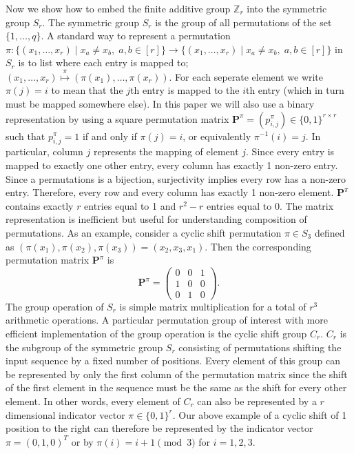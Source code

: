 Now we show how to embed the finite additive group $\mathbb{Z}_r$ into the symmetric group $S_r$. The symmetric group $S_r$ is the group of all permutations of the set $\{1, \dots, q\}$. A standard way to represent a permutation $\pi \colon \{(x_1, \dots, x_r) \mid x_a \neq x_b, \; a,b \in [r]\} \to \{(x_1, \dots, x_r) \mid x_a \neq x_b, \; a,b \in [r]\}$ in $S_r$ is to list where each entry is mapped to; $(x_1,\dots,x_r) \stackrel{\pi}{\mapsto} (\pi(x_1), \dots, \pi(x_r))$. For each seperate element we write $\pi(j) = i$ to mean that the $j$th entry is mapped to the $i$th entry (which in turn must be mapped somewhere else). In this paper we will also use a binary representation by using a square permutation matrix $\mathbf{P}^{\pi} = (p^{\pi}_{i,j}) \in \{0,1\}^{r \times r}$ such that $p^{\pi}_{i, j} = 1$ if and only if $\pi(j) = i$, or equivalently $\pi^{-1}(i) = j$. In particular, column $j$ represents the mapping of element $j$. Since every entry is mapped to exactly one other entry, every column has exactly 1 non-zero entry. Since a permutations is a bijection, surjectivity implies every row has a non-zero entry. Therefore, every row and every column has exactly 1 non-zero element. $\mathbf{P}^{\pi}$ contains exactly $r$ entries equal to 1 and $r^2 - r$ entries equal to 0. The matrix representation is inefficient but useful for understanding composition of permutations. As an example, consider a cyclic shift permutation $\pi \in S_3$ defined as $(\pi(x_1),\pi(x_2),\pi(x_3))=(x_2,x_3,x_1)$. Then the corresponding permutation matrix $\mathbf{P}^{\pi}$ is
\begin{equation*}
    \mathbf{P}^{\pi} = \begin{pmatrix}
        0 & 0 & 1 \\
        1 & 0 & 0 \\
        0 & 1 & 0
    \end{pmatrix}.
\end{equation*}
The group operation of $S_r$ is simple matrix multiplication for a total of $r^3$ arithmetic operations. A particular permutation group of interest with more efficient implementation of the group operation is the cyclic shift group $C_r$. $C_r$ is the subgroup of the symmetric group $S_r$ consisting of permutations shifting the input sequence by a fixed number of positions. Every element of this group can be represented by only the first column of the permutation matrix since the shift of the first element in the sequence must be the same as the shift for every other element. In other words, every element of $C_r$ can also be represented by a $r$ dimensional indicator vector $\pi \in \{0,1\}^r$. Our above example of a cyclic shift of 1 position to the right can therefore be represented by the indicator vector $\pi = (0,1,0)^T$ or by $\pi(i) = i + 1 \pmod 3$ for $i = 1, 2, 3$. 
